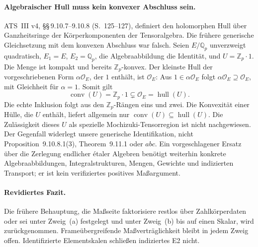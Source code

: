 \documentclass[11pt,a4paper]{article}
\theoremstyle{definition}
\theoremstyle{plain}
\theoremstyle{definition}
\begin{document}
\paragraph{Algebraischer Hull muss kein konvexer Abschluss sein.}
ATS~III v4, \S\S\,9.10.7--9.10.8 (S.~125--127), definiert den holomorphen
Hull über Ganzheitsringe der Körperkomponenten der Tensoralgebra.
Die frühere generische Gleichsetzung mit dem konvexen Abschluss war falsch.
Seien $E/\mathbb Q_p$ unverzweigt quadratisch, $E_1=E$,
$E_2=\mathbb Q_p$, die Algebraabbildung die Identität, und $U=\mathbb Z_p\cdot1$.
Die Menge ist kompakt und bereits $\mathbb Z_p$-konvex. Der kleinste
Hull der vorgeschriebenen Form $\alpha\mathcal O_E$, der $1$ enthält, ist
$\mathcal O_E$: Aus $1\in\alpha\mathcal O_E$ folgt
$\alpha\mathcal O_E\supseteq\mathcal O_E$, mit Gleichheit für
$\alpha=1$. Somit gilt
\[
 \operatorname{conv}(U)=\mathbb Z_p\cdot1
 \subsetneq\mathcal O_E=\operatorname{hull}(U).
\]
Die echte Inklusion folgt aus den $\mathbb Z_p$-Rängen eins und zwei.
Die Konvexität einer Hülle, die $U$ enthält, liefert allgemein nur
$\operatorname{conv}(U)\subseteq\operatorname{hull}(U)$.
Die Zulässigkeit dieses $U$ als spezielle Mochizuki-Tensorregion ist
nicht nachgewiesen. Der Gegenfall widerlegt unsere generische Identifikation,
nicht Proposition~9.10.8.1(3), Theorem~9.11.1 oder $abc$.
Ein vorgeschlagener Ersatz über die Zerlegung endlicher étaler Algebren
benötigt weiterhin konkrete Algebraabbildungen, Integralstrukturen,
Mengen, Gewichte und indizierten Transport; er ist kein verifiziertes
positives Maßargument.

\paragraph{Revidiertes Fazit.}
Die frühere Behauptung, die Maßseite faktorisiere restlos über Zahlkörperdaten
oder sei unter Zweig~(a) festgelegt und unter Zweig~(b) bis auf einen Skalar,
wird zurückgenommen. Frameübergreifende Maßverträglichkeit bleibt in jedem
Zweig offen. Identifizierte Elementskalen schließen indiziertes E2 nicht.
\end{document}
